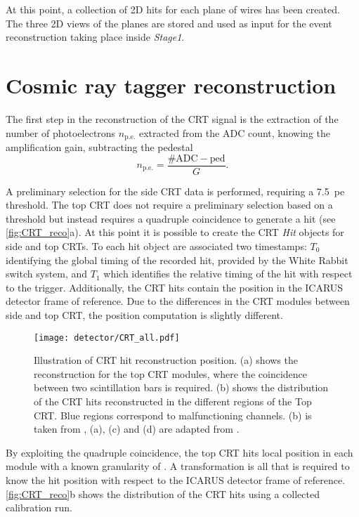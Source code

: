 At this point, a collection of 2D hits for each plane of wires has been created. The three 2D views of the planes are stored and used as input for the event reconstruction taking place inside \emph{Stage1}. 

\section{Cosmic ray tagger reconstruction} The first step in the reconstruction of the CRT signal is the extraction of the number of photoelectrons $n_\mathrm{p.e.}$ extracted from the ADC count, knowing the amplification gain, subtracting the pedestal \begin{equation}
    n_\mathrm{p.e.} = \frac{\mathrm{\#ADC} - \mathrm{ped}}{G}. 
\end{equation} 

A preliminary selection for the side CRT data is performed, requiring a \SI{7.5}{pe} threshold. The top CRT does not require a preliminary selection based on a threshold but instead requires a quadruple coincidence to generate a hit (see \autoref{fig:CRT_reco}a). At this point it is possible to create the CRT \emph{Hit} objects for side and top CRTs. To each hit object are associated two timestamps:  $T_0$ identifying the global timing of the recorded hit, provided by the White Rabbit switch system, and $T_1$ which identifies the relative timing of the hit with respect to the trigger. Additionally, the CRT hits contain the position in the ICARUS detector frame of reference. Due to the differences in the CRT modules between side and top CRT, the position computation is slightly different. 

\begin{figure}
    \centering
    \texttt{[image: detector/CRT\_all.pdf]}
    \caption[CRT Hit reconstruction in space]{Illustration of CRT hit reconstruction position. (a) shows the reconstruction for the top CRT modules, where the coincidence between two scintillation bars is required. (b) shows the distribution of the CRT hits reconstructed in the different regions of the Top CRT. Blue regions
correspond to malfunctioning channels. (b) is taken from \cite{Poppi:2023zmp}, (a), (c) and (d) are adapted from \cite{arteroponsStudyReconstructionNuMuCC}.}
    \label{fig:CRT_reco}
\end{figure}

By exploiting the quadruple coincidence, the top CRT hits local position in each module with a known granularity of . A transformation is all that is required to know the hit position with respect to the ICARUS detector frame of reference. \autoref{fig:CRT_reco}b shows the distribution of the CRT hits using a collected calibration run. 

